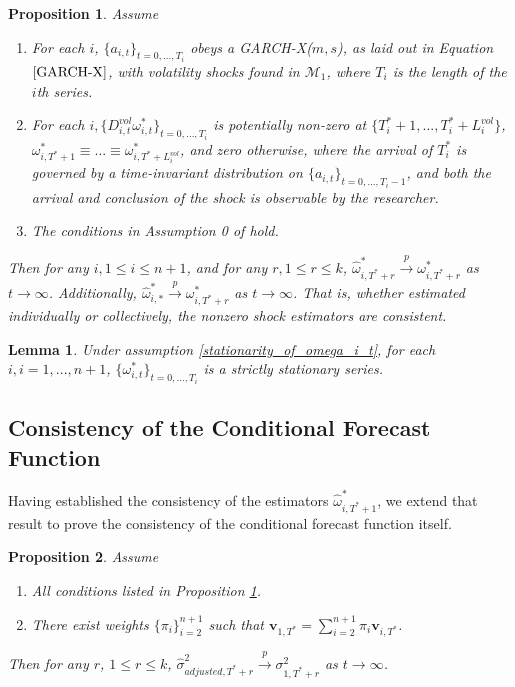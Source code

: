 \documentclass[11pt,3p,review,authoryear]{elsarticle}
\newcommand{\weight}{\pi}
\def\mc#1{\mathcal{#1}} %
\def\mc#1{\mathcal{#1}}
\newtheorem{lem}{Lemma}
\newtheorem{prop}{Proposition}
\theoremstyle{definition}
\begin{document}
\begin{prop}\label{omega_consistency}
Assume
\begin{enumerate}
  \item For each $i$, $\{a_{i,t}\}_{t=0,...,T_i}$ obeys a GARCH-X($m,s$), as laid out in Equation $\eqref{GARCH-X}$, with volatility shocks found in $\mc{M}_{1}$, where $T_i$ is the length of the $i$th series.
  \item For each $i, \{D^{vol}_{i,t}\omega_{i,t}^{*}\}_{t=0,...,T_i}$ is potentially non-zero at $\{T^{*}_{i}+1,... ,T^{*}_{i}+L_{i}^{vol}\}$, $\omega_{i,T^{*}+1}^{*}\equiv...\equiv\omega_{i,T^{*}+L_{i}^{vol}}^{*}$, and zero otherwise, where the arrival of $T_{i}^{*}$ is governed by a time-invariant distribution on $\{a_{i,t}\}_{t=0,...,T_i-1}$, and both the arrival and conclusion of the shock is observable by the researcher. \label{stationarity_of_omega_i_t}
  \item The conditions in Assumption 0 of \citet{han2014asymptotic} hold.
\end{enumerate}
Then for any $i, 1\leq i \leq n+1$, and for any $r, 1\leq r \leq k$, $\hat\omega_{i,T^{*}+r}^{*} \overset{p}{\longrightarrow} \omega_{i,T^{*}+r}^{*}$ as $t\rightarrow\infty$.  Additionally, $\hat\omega_{i,*}^{*} \overset{p}{\longrightarrow} \omega_{i,T^{*}+r}^{*}$ as $t\rightarrow\infty$.  That is, whether estimated  individually or collectively, the nonzero shock estimators are consistent.
\end{prop}

\begin{lem}\label{lemma_ref}
  Under assumption \ref{stationarity_of_omega_i_t}, for each $i, i=1,...,n+1$,  $\{\omega_{i,t}^{*}\}_{t=0,...,T_i}$ is a strictly stationary series.
\end{lem}



\subsection{Consistency of the Conditional Forecast Function}

Having established the consistency of the estimators $\hat\omega^{*}_{i,T^{*}+1}$, we extend that result to prove the consistency of the conditional forecast function itself.

  \begin{prop}\label{sigma_consistency}
    Assume
    \begin{enumerate}
      \item All conditions listed in Proposition \ref{omega_consistency}.
      \item There exist weights $\{\pi_{i}\}_{i=2}^{n+1}$ such that $\textbf{v}_{1,T^{*}} = \sum^{n+1}_{i=2}\weight_{i} \textbf{v}_{i,T^{*}}$.
     \end{enumerate}
  Then for any $r$, $1\leq r \leq k$, $\hat\sigma^{2}_{adjusted,T^{*}+r}\overset{p}{\longrightarrow}\sigma^{2}_{1,T^{*}+r}$ as $t\rightarrow\infty$. 
  \end{prop}
\end{document}
